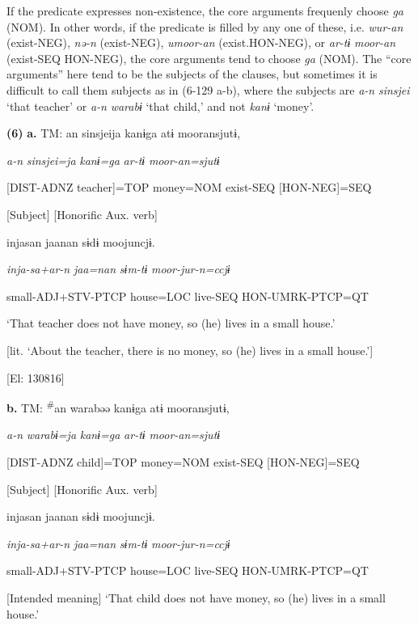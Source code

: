 If the predicate expresses non-existence, the core arguments frequenly choose \textit{ga} (NOM). In other words, if the predicate is filled by any one of these, i.e. \textit{wur-an} (exist-NEG), \textit{nə-n} (exist-NEG), \textit{umoor-an} (exist.HON-NEG), or \textit{ar-tɨ} \textit{moor-an} (exist-SEQ HON-NEG), the core arguments tend to choose \textit{ga} (NOM). The “core arguments” here tend to be the subjects of the clauses, but sometimes it is difficult to call them subjects as in (6-129 a-b), where the subjects are \textit{a-n} \textit{sinsjei} ‘that teacher’ or \textit{a-n} \textit{warabɨ} ‘that child,’ and not \textit{kanɨ} ‘money’.

\textbf{(6)}  \textbf{a.}  TM:  an  sinsjeija  kanɨga  atɨ  mooransjutɨ,

      \textit{a-n}  \textit{sinsjei=ja}  \textit{kanɨ=ga}  \textit{ar-tɨ}  \textit{moor-an=sjutɨ}

      [DIST-ADNZ  teacher]=TOP  money=NOM  exist-SEQ  [HON-NEG]=SEQ

      [Subject]      [Honorific Aux. verb]

      injasan  jaanan  sɨdɨ  moojuncjɨ.

      \textit{inja-sa+ar-n}  \textit{jaa=nan}  \textit{sɨm-tɨ}  \textit{moor-jur-n=ccjɨ}

      small-ADJ+STV-PTCP  house=LOC  live-SEQ  HON-UMRK-PTCP=QT

      ‘That teacher does not have money, so (he) lives in a small house.’

[lit. ‘About the teacher, there is no money, so (he) lives in a small house.’]

      [El: 130816]

  \textbf{b.}  TM:  \textsuperscript{\#}an  warabəə  kanɨga  atɨ  mooransjutɨ,

      \textit{a-n}  \textit{warabɨ=ja}  \textit{kanɨ=ga}  \textit{ar-tɨ}  \textit{moor-an=sjutɨ}

      [DIST-ADNZ  child]=TOP  money=NOM  exist-SEQ  [HON-NEG]=SEQ

      [Subject]      [Honorific Aux. verb]

      injasan  jaanan  sɨdɨ  moojuncjɨ.

      \textit{inja-sa+ar-n}  \textit{jaa=nan}  \textit{sɨm-tɨ}  \textit{moor-jur-n=ccjɨ}

      small-ADJ+STV-PTCP  house=LOC  live-SEQ  HON-UMRK-PTCP=QT

      [Intended meaning] ‘That child does not have money, so (he) lives in a small house.’

